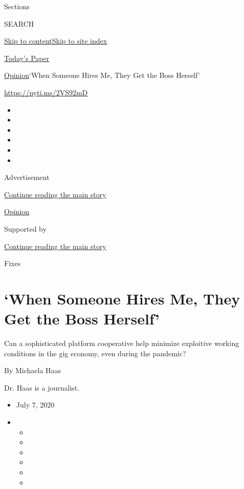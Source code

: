 Sections

SEARCH

\protect\hyperlink{site-content}{Skip to
content}\protect\hyperlink{site-index}{Skip to site index}

\href{https://myaccount.nytimes3xbfgragh.onion/auth/login?response_type=cookie\&client_id=vi}{}

\href{https://www.nytimes3xbfgragh.onion/section/todayspaper}{Today's
Paper}

\href{/section/opinion}{Opinion}\textbar{}`When Someone Hires Me, They
Get the Boss Herself'

\url{https://nyti.ms/2VS92mD}

\begin{itemize}
\item
\item
\item
\item
\item
\item
\end{itemize}

Advertisement

\protect\hyperlink{after-top}{Continue reading the main story}

\href{/section/opinion}{Opinion}

Supported by

\protect\hyperlink{after-sponsor}{Continue reading the main story}

Fixes

\hypertarget{when-someone-hires-me-they-get-the-boss-herself}{%
\section{`When Someone Hires Me, They Get the Boss
Herself'}\label{when-someone-hires-me-they-get-the-boss-herself}}

Can a sophisticated platform cooperative help minimize exploitive
working conditions in the gig economy, even during the pandemic?

By Michaela Haas

Dr. Haas is a journalist.

\begin{itemize}
\item
  July 7, 2020
\item
  \begin{itemize}
  \item
  \item
  \item
  \item
  \item
  \item
  \end{itemize}
\end{itemize}

